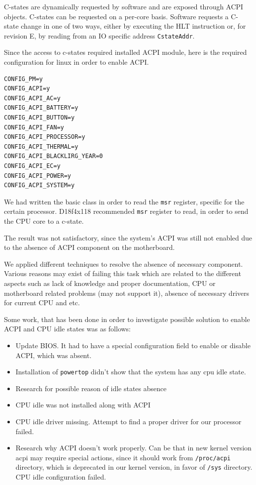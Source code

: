 \documentclass[]{report}
\begin{document}
C-states are dynamically requested by software and are exposed through
ACPI objects. C-states can be requested on a per-core basis. Software
requests a C-state change in one of two ways, either by executing the
HLT instruction or, for revision E, by reading from an IO specific
address \lstinline!CstateAddr!.

Since the access to c-states required installed ACPI module, here is the
required configuration for linux in order to enable ACPI.

\begin{lstlisting}[style=simple]
CONFIG_PM=y
CONFIG_ACPI=y
CONFIG_ACPI_AC=y
CONFIG_ACPI_BATTERY=y
CONFIG_ACPI_BUTTON=y
CONFIG_ACPI_FAN=y
CONFIG_ACPI_PROCESSOR=y
CONFIG_ACPI_THERMAL=y
CONFIG_ACPI_BLACKLIRG_YEAR=0
CONFIG_ACPI_EC=y
CONFIG_ACPI_POWER=y
CONFIG_ACPI_SYSTEM=y
\end{lstlisting}

We had written the basic class in order to read the \lstinline!msr!
register, specific for the certain processor. D18f4x118 recommended
\lstinline!msr! register to read, in order to send the CPU core to a
c-state.

The result was not satisfactory, since the system's ACPI was still not
enabled due to the absence of ACPI component on the motherboard.

We applied different techniques to resolve the absence of necessary
component. Various reasons may exist of failing this task which are
related to the different aspects such as lack of knowledge and proper
documentation, CPU or motherboard related problems (may not support it),
absence of necessary drivers for current CPU and etc.

Some work, that has been done in order to investigate possible solution
to enable ACPI and CPU idle states was as follows:

\begin{itemize}
\itemsep1pt\parskip0pt
\item
  Update BIOS. It had to have a special configuration field to enable or
  disable ACPI, which was absent.
\item
  Installation of \lstinline!powertop! didn't show that the system has
  any cpu idle state.
\item
  Research for possible reason of idle states absence
\item
  CPU idle was not installed along with ACPI
\item
  CPU idle driver missing. Attempt to find a proper driver for our
  processor failed.
\item
  Research why ACPI doesn't work properly. Can be that in new kernel
  version acpi may require special actions, since it should work from
  \lstinline!/proc/acpi! directory, which is deprecated in our kernel
  version, in favor of \lstinline!/sys! directory. CPU idle
  configuration failed.
\end{itemize}
\end{document}
